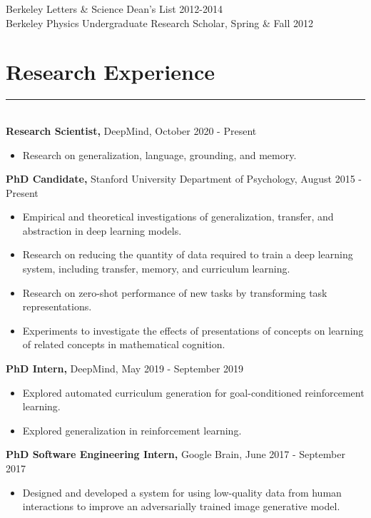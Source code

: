 \documentclass[margin]{res}
\begin{document}
\begin{resume}
Berkeley Letters \& Science Dean's List 2012-2014\\
Berkeley Physics Undergraduate Research Scholar, Spring \& Fall 2012
\vspace{1pt}\section{Research Experience} \vspace{-15pt} \rule{\textwidth}{0.5pt} \\[3pt]
{\bf Research Scientist,} DeepMind, October 2020 - Present 
\begin{itemize} \itemsep -2pt
  \item Research on generalization, language, grounding, and memory. 
\end{itemize}\vspace{-8pt}
{\bf PhD Candidate,} Stanford University Department of Psychology, August 2015 - Present 
\begin{itemize} \itemsep -2pt
  \item Empirical and theoretical investigations of generalization, transfer, and abstraction in deep learning models. 
  \item Research on reducing the quantity of data required to train a deep learning system, including transfer, memory, and curriculum learning.
  \item Research on zero-shot performance of new tasks by transforming task representations.
  \item Experiments to investigate the effects of presentations of concepts on learning of related concepts in mathematical cognition.
\end{itemize}\vspace{-8pt}
{\bf PhD Intern,} DeepMind, May 2019 - September 2019
\begin{itemize} \itemsep -2pt
  \item Explored automated curriculum generation for goal-conditioned reinforcement learning.
  \item Explored generalization in reinforcement learning.
\end{itemize}\vspace{-8pt}
{\bf PhD Software Engineering Intern,} Google Brain, June 2017 - September 2017 
\begin{itemize} \itemsep -2pt
  \item Designed and developed a system for using low-quality data from human interactions to improve an adversarially trained image generative model. 

\end{itemize}
\end{resume}
\end{document}
